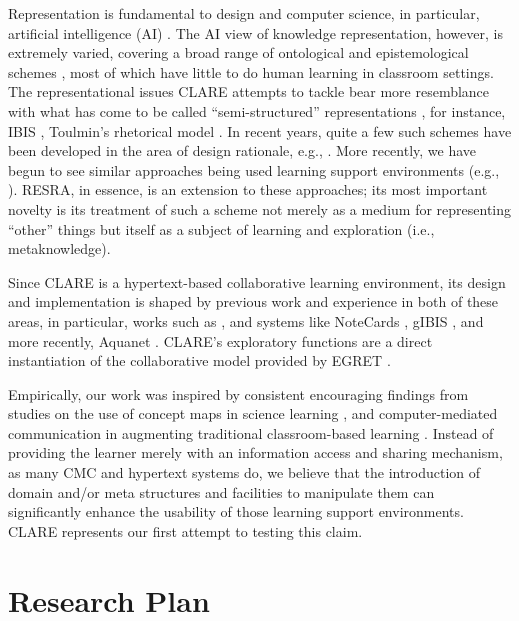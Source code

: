 Representation is fundamental to design and computer science, in
particular, artificial intelligence (AI) \cite{Winograd87}. The AI view of
knowledge representation, however, is extremely varied, covering a broad
range of ontological and epistemological schemes \cite{Swaminathan90}, most
of which have little to do human learning in classroom settings.  The
representational issues CLARE attempts to tackle bear more resemblance with
what has come to be called ``semi-structured'' representations
\cite{Lee90}, for instance, IBIS \cite{Kunz70,Conklin88Gibis}, Toulmin's
rhetorical model \cite{Toulmin84}. In recent years, quite a few such
schemes have been developed in the area of design rationale, e.g.,
\cite{Lee91What,MacLean89Design,Conklin91Process}. More recently, we have
begun to see similar approaches being used learning support environments
(e.g., \cite{Cavalli-Sforza92}). RESRA, in essence, is an extension to
these approaches; its most important novelty is its treatment of such a
scheme not merely as a medium for representing ``other'' things but itself
as a subject of learning and exploration (i.e., metaknowledge).

Since CLARE is a hypertext-based collaborative learning environment, its
design and implementation is shaped by previous work and experience in both
of these areas, in particular, works such as
\cite{Conklin88Gibis,Halasz88Reflections}, and systems like NoteCards
\cite{Halasz87NOTECARDS}, gIBIS \cite{Conklin88Gibis}, and more recently,
Aquanet \cite{MARSHALL91Aquanet}.  CLARE's exploratory functions are a
direct instantiation of the collaborative model provided by EGRET
\cite{csdl-91-02,csdl-92-01,csdl-92-08}.

Empirically, our work was inspired by consistent encouraging findings from
studies on the use of concept maps in science learning \cite{Cliburn90},
and computer-mediated communication in augmenting traditional
classroom-based learning \cite{HILTZ88Collaborative}. Instead of providing
the learner merely with an information access and sharing mechanism, as
many CMC and hypertext systems do, we believe that the introduction of
domain and/or meta structures and facilities to manipulate them can
significantly enhance the usability of those learning support environments.
CLARE represents our first attempt to testing this claim.

\section{Research Plan}
\label{sec:plan}

